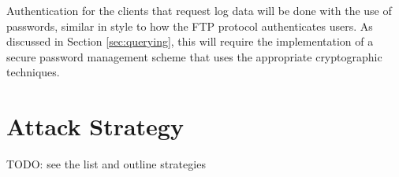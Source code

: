 \documentclass{sig-alternate}
\begin{document}
Authentication for the clients that request log data will be done with the use of passwords, similar in style to how the 
FTP protocol authenticates users. As discussed in Section \ref{sec:querying}, this will require the implementation of 
a secure password management scheme that uses the appropriate cryptographic techniques. 


\section{Attack Strategy}
\label{sec:attack}

TODO: see the list and outline strategies

\balance
\end{document}
